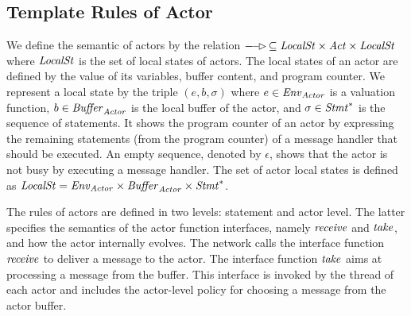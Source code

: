 \subsection{Template Rules of Actor}
We define the semantic of actors by the relation $\aoverto{}\,\subseteq \local\times \Act \times \local$ where $\mathit{LocalSt}$ is the set of local states of actors. The local states of an actor are defined by the value of its variables, buffer content, and program counter. We represent a local state by the triple $(e,b,\sigma)$ where $e\in\mathit{Env}_{\it Actor}$ is a valuation function, $b\in\mathit{Buffer}_{\it Actor}$ is the local buffer of the actor, and $\sigma\in \mathit{Stmt}^*$ is the sequence of statements. It shows the program counter of an actor by expressing the remaining statements (from the program counter) of a message handler that should be executed. An empty sequence, denoted by $\epsilon$, shows that the actor is not busy by executing a message handler. The set of actor local states is defined as $\mathit{LocalSt} = \mathit{Env}_{\it Actor}\times\mathit{Buffer}_{\it Actor}\times 
\mathit{Stmt}^\ast$. 

The rules of actors are defined in two levels: statement and actor level. The latter specifies the semantics of the actor function interfaces, namely $\mathit{receive}$ and $\mathit{take}$, and how the actor internally evolves. The network calls the interface function $\mathit{receive}$ to deliver a message to the actor.  The interface function $\mathit{take}$ aims at processing a message from the buffer. This interface is invoked by the thread of each actor and includes the actor-level policy for choosing a message from the actor buffer. 

